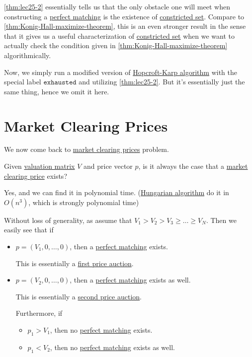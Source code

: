 \begin{remark}
	\autoref{thm:lec25-2} essentially tells us that the only obstacle one will meet when constructing a \hyperref[def:perfect-matching]{perfect matching} is the existence of \hyperref[def:constricted-set]{constricted set}. Compare to \autoref{thm:Konig-Hall-maximize-theorem}, this is an even stronger result in the sense that it gives us a useful characterization of \hyperref[def:constricted-set]{constricted set} when we want to actually check the condition given in \autoref{thm:Konig-Hall-maximize-theorem} algorithmically.
\end{remark}

Now, we simply run a modified version of \hyperref[algo:Hopcroft-Karp-algorithm]{Hopcroft-Karp algorithm} with the special label \(\mathtt{exhausted}\) and utilizing \autoref{thm:lec25-2}. But it's essentially just the same thing, hence we omit it here.

\section{Market Clearing Prices}
We now come back to \hyperref[note:market-clearing-prices]{market clearing prices} problem.

\begin{problem}
Given \hyperref[def:valuation-matrix]{valuation matrix} \(V\) and price vector \(p\), is it always the case that a \hyperref[note:market-clearing-prices]{market clearing price} exists?
\end{problem}
\begin{answer}
	Yes, and we can find it in polynomial time. (\href{https://en.wikipedia.org/wiki/Hungarian_algorithm}{Hungarian algorithm} do it in \(O(n^{3})\), which is strongly polynomial time)
\end{answer}

Without loss of generality, as assume that \(V_{1}>V_{2}>V_{3}\geq \dots \geq V_{N}\). Then we easily see that if
\begin{itemize}
	\item \(p = (V_{1}, 0, \dots , 0 )\), then a \hyperref[def:perfect-matching]{perfect matching} exists.
	      \begin{note}
		      This is essentially a \hyperref[eg:first-price-auction]{first price auction}.
	      \end{note}
	\item \(p = (V_{2}, 0, \dots , 0 )\), then a \hyperref[def:perfect-matching]{perfect matching} exists as well.
	      \begin{note}
		      This is essentially a \hyperref[eg:second-price-auction]{second price auction}.
	      \end{note}
	      Furthermore, if
	      \begin{itemize}
		      \item \(p_{1}>V_{1}\), then no \hyperref[def:perfect-matching]{perfect matching} exists.
		      \item \(p_{1}<V_{2}\), then no \hyperref[def:perfect-matching]{perfect matching} exists as well.
	      \end{itemize}
\end{itemize}

